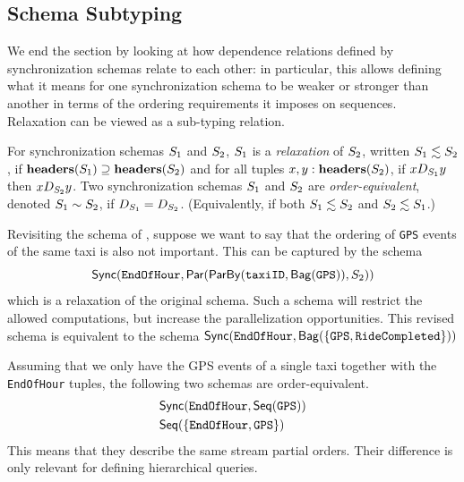 \subsection{Schema Subtyping}

We end the section by looking at how dependence relations defined
by synchronization schemas relate to each other: in particular, this allows defining what it means
for one synchronization schema to be weaker or stronger than another in terms of the ordering requirements it imposes on sequences.
Relaxation can be viewed as a sub-typing relation.

\begin{definition}
    \label{45:def:schema-relaxation}
    \label{45:def:schema-equivalence}
    For synchronization schemas $\ss_1$ and $\ss_2$,  $\ss_1$ is a \emph{relaxation} of $\ss_2$, written $\ss_1 \lesssim \ss_2$, if
    $\headers(\ss_1) \supseteq \headers(\ss_2)$
    and for all tuples $x, y: \headers(\ss_2)$,
    if $x D_{\ss_1} y$ then $x D_{\ss_2} y$.
    Two synchronization schemas $\ss_1$ and $\ss_2$ are \emph{order-equivalent}, denoted $\ss_1 \sim \ss_2$, if $D_{\ss_1} = D_{\ss_2}$.
    (Equivalently, if both $\ss_1 \lesssim \ss_2$ and $\ss_2 \lesssim \ss_1$.)
    \end{definition}

\begin{example}
Revisiting the schema of , suppose we want to say that
the ordering of \texttt{GPS} events of the same taxi is also not important.
This can be captured by the schema
$$
\hier
    {\texttt{EndOfHour}}
    {\parcomp
        {\keyby
            {\texttt{taxiID}}
            {\relleaf{\texttt{GPS}}}}
        {\ss_2}}
$$
which is a relaxation of the original schema.
Such a schema will
restrict the allowed computations, but increase the parallelization opportunities.
This revised schema is equivalent to the schema
$\hier{\texttt{EndOfHour}}{\relleaf{\{\texttt{GPS},\texttt{RideCompleted} \}}}$

Assuming that we only have the GPS events of a single taxi together with the \texttt{EndOfHour} tuples, the following two schemas are order-equivalent.
\begin{align*}
    & \hier
        { \texttt{EndOfHour}  }
        {\seqleaf
            {  \texttt{GPS} }} \\
    & \seqleaf
        {\{ \texttt{EndOfHour}, \texttt{GPS} \} }
\end{align*}
This means that they describe the same stream partial orders. Their difference is only relevant for defining hierarchical queries.
\end{example}

